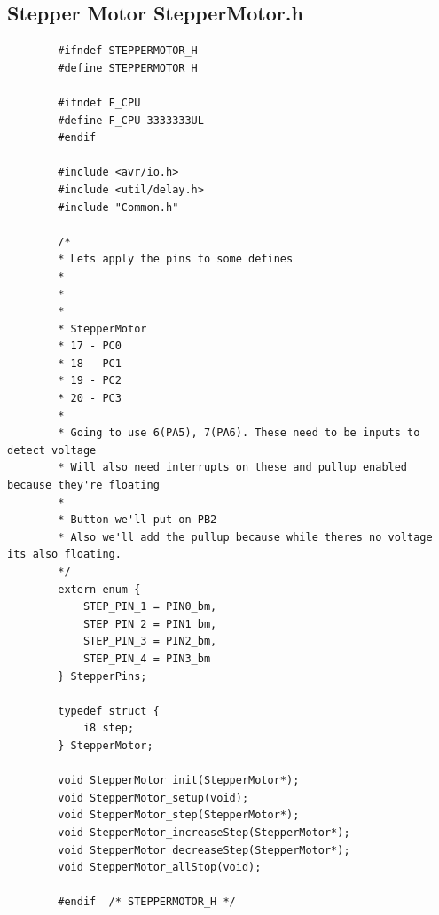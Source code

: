 \documentclass[11pt,a4paper,titlepage]{report}
\begin{document}
	\subsection{Stepper Motor StepperMotor.h}\label{appendix:final_code_stepper_motor_h}
	\begin{lstlisting}
		#ifndef STEPPERMOTOR_H
		#define	STEPPERMOTOR_H
		
		#ifndef F_CPU
		#define F_CPU 3333333UL
		#endif
		
		#include <avr/io.h>
		#include <util/delay.h>
		#include "Common.h"
		
		/*
		* Lets apply the pins to some defines
		* 
		* 
		* 
		* StepperMotor
		* 17 - PC0
		* 18 - PC1
		* 19 - PC2
		* 20 - PC3
		* 
		* Going to use 6(PA5), 7(PA6). These need to be inputs to detect voltage
		* Will also need interrupts on these and pullup enabled because they're floating
		* 
		* Button we'll put on PB2
		* Also we'll add the pullup because while theres no voltage its also floating. 
		*/
		extern enum {
			STEP_PIN_1 = PIN0_bm,
			STEP_PIN_2 = PIN1_bm,
			STEP_PIN_3 = PIN2_bm,
			STEP_PIN_4 = PIN3_bm
		} StepperPins;
		
		typedef struct {
			i8 step;
		} StepperMotor;
		
		void StepperMotor_init(StepperMotor*);
		void StepperMotor_setup(void);
		void StepperMotor_step(StepperMotor*);
		void StepperMotor_increaseStep(StepperMotor*);
		void StepperMotor_decreaseStep(StepperMotor*);
		void StepperMotor_allStop(void);
		
		#endif	/* STEPPERMOTOR_H */
	\end{lstlisting}
	
\end{document}
